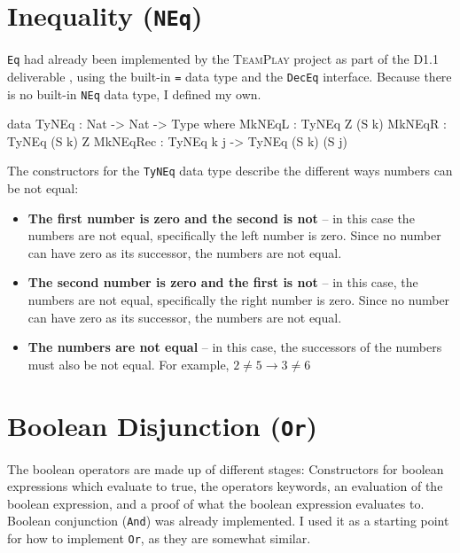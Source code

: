 \section{Inequality (\texttt{NEq})}
    \texttt{Eq} had already been implemented by the \textsc{TeamPlay} project as part of the D1.1 deliverable \cite{teamplay:d1.1}, using the built-in \texttt{=} data type and the \texttt{DecEq} interface. Because there is no built-in \texttt{NEq} data type, I defined my own.
    \begin{code}[caption={The data type used for capturing inequality}]
        data TyNEq : Nat -> Nat -> Type where
            MkNEqL   : TyNEq Z (S k)
            MkNEqR   : TyNEq (S k) Z
            MkNEqRec : TyNEq k j -> TyNEq (S k) (S j)
    \end{code}
    The constructors for the \texttt{TyNEq} data type describe the different ways numbers can be not equal:
    \begin{itemize}
        \item \textbf{The first number is zero and the second is not} -- in this case the numbers are not equal, specifically the left number is zero. Since no number can have zero as its successor, the numbers are not equal.
        \item \textbf{The second number is zero and the first is not} -- in this case, the numbers are not equal, specifically the right number is zero. Since no number can have zero as its successor, the numbers are not equal.
        \item \textbf{The numbers are not equal} -- in this case, the successors of the numbers must also be not equal. For example, $2 \neq 5 \rightarrow 3 \neq 6$
    \end{itemize}
    
\section{Boolean Disjunction (\texttt{Or})}
    The boolean operators are made up of different stages: Constructors for boolean expressions which evaluate to true, the operators keywords, an evaluation of the boolean expression, and a proof of what the boolean expression evaluates to. Boolean conjunction (\texttt{And}) was already implemented. I used it as a starting point for how to implement \texttt{Or}, as they are somewhat similar.
    
